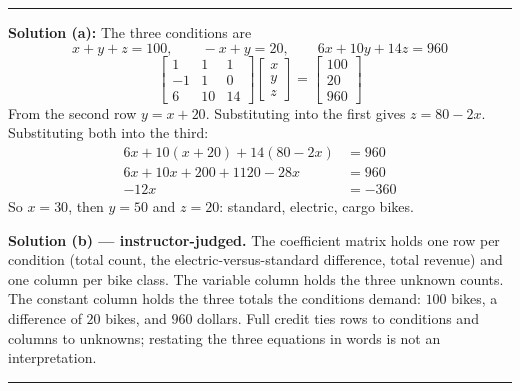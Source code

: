 \documentclass[12pt]{article}
\begin{document}
\vspace{0.2cm}\noindent\rule{\linewidth}{0.2pt}


\textbf{Solution (a):} The three conditions are
\[ x + y + z = 100, \qquad -x + y = 20, \qquad 6x + 10y + 14z = 960 \]
\[ \begin{bmatrix} 1 & 1 & 1 \\ -1 & 1 & 0 \\ 6 & 10 & 14 \end{bmatrix}
   \begin{bmatrix} x \\ y \\ z \end{bmatrix}
   = \begin{bmatrix} 100 \\ 20 \\ 960 \end{bmatrix} \]
From the second row $y = x + 20$. Substituting into the first gives $z = 80 - 2x$.
Substituting both into the third:
\begin{align*}
  6x + 10(x + 20) + 14(80 - 2x) &= 960 \\
  6x + 10x + 200 + 1120 - 28x &= 960 \\
  -12x &= -360
\end{align*}
So $x = 30$, then $y = 50$ and $z = 20$:  standard,  electric,
 cargo bikes.

\vspace{0.15cm}
\textbf{Solution (b) --- instructor-judged.} The coefficient matrix holds one row per
condition (total count, the electric-versus-standard difference, total revenue) and one
column per bike class. The variable column holds the three unknown counts. The constant
column holds the three totals the conditions demand: $100$ bikes, a difference of $20$ bikes,
and $960$ dollars. Full credit ties rows to conditions and columns to unknowns; restating
the three equations in words is not an interpretation.

\vspace{0.2cm}\noindent\rule{\linewidth}{0.2pt}
\end{document}
